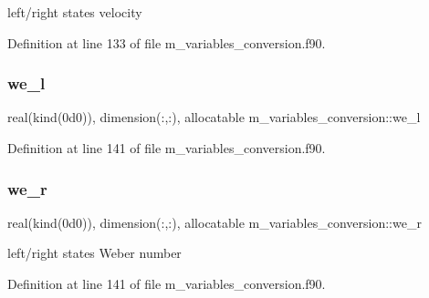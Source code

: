 left/right states velocity 



Definition at line 133 of file m\+\_\+variables\+\_\+conversion.\+f90.

\mbox{\label{namespacem__variables__conversion_a87022a7b6fc9b57912e4fca2d38bd0e2}} 
\subsubsection{\texorpdfstring{we\+\_\+l}{we\_l}}
{\footnotesize\ttfamily real(kind(0d0)), dimension(\+:,\+:), allocatable m\+\_\+variables\+\_\+conversion\+::we\+\_\+l}



Definition at line 141 of file m\+\_\+variables\+\_\+conversion.\+f90.

\mbox{\label{namespacem__variables__conversion_a0b984f6015e127568f82af37a3135ceb}} 
\subsubsection{\texorpdfstring{we\+\_\+r}{we\_r}}
{\footnotesize\ttfamily real(kind(0d0)), dimension(\+:,\+:), allocatable m\+\_\+variables\+\_\+conversion\+::we\+\_\+r}



left/right states Weber number 



Definition at line 141 of file m\+\_\+variables\+\_\+conversion.\+f90.

